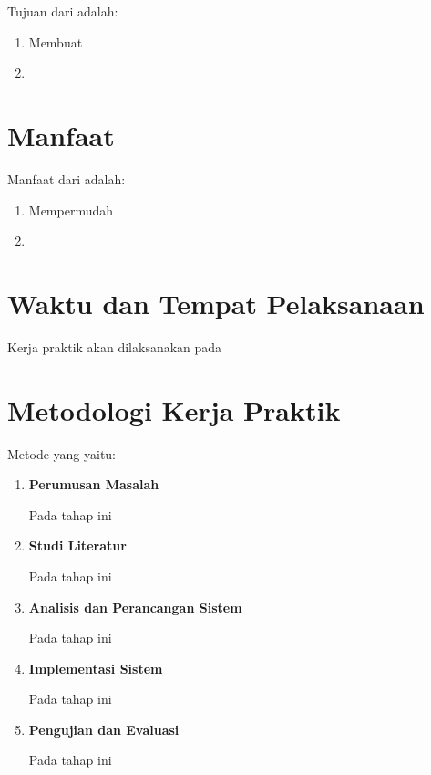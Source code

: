 Tujuan dari \lipsum[4][1-3] adalah:

\begin{enumerate}[nolistsep]

  \item Membuat \lipsum[4][4-5]

  \item \lipsum[4][6-9]

\end{enumerate}

\section{Manfaat}

Manfaat dari \lipsum[5][1-3] adalah:

\begin{enumerate}[nolistsep]

  \item Mempermudah \lipsum[5][4-5]

  \item \lipsum[5][6-10]

\end{enumerate}

\section{Waktu dan Tempat Pelaksanaan}

Kerja praktik akan dilaksanakan pada \lipsum[6][1-3]

\section{Metodologi Kerja Praktik}

Metode yang \lipsum[7][1-5] yaitu:

\begin{enumerate}[nolistsep]

  \item \textbf{Perumusan Masalah}

  Pada tahap ini \lipsum[7][6-9]

  \item \textbf{Studi Literatur}

  Pada tahap ini \lipsum[7][10-13]

  \item \textbf{Analisis dan Perancangan Sistem}

  Pada tahap ini \lipsum[8][1-2]

  \item \textbf{Implementasi Sistem}

  Pada tahap ini \lipsum[8][3-6]

  \item \textbf{Pengujian dan Evaluasi}

  Pada tahap ini \lipsum[8][7-12]

\end{enumerate}

